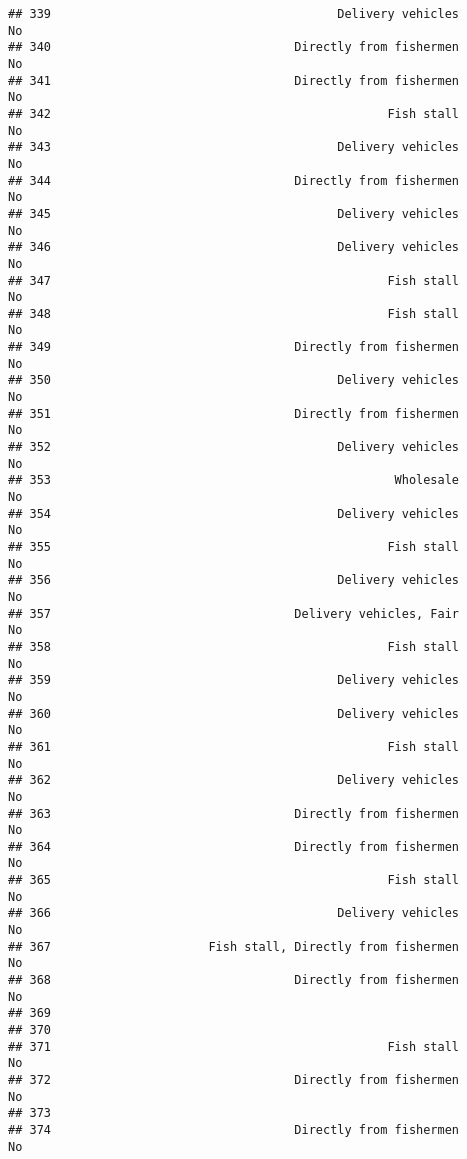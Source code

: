 \documentclass[
]{article}
\begin{document}
\begin{verbatim}
## 339                                        Delivery vehicles        No
## 340                                  Directly from fishermen        No
## 341                                  Directly from fishermen        No
## 342                                               Fish stall        No
## 343                                        Delivery vehicles        No
## 344                                  Directly from fishermen        No
## 345                                        Delivery vehicles        No
## 346                                        Delivery vehicles        No
## 347                                               Fish stall        No
## 348                                               Fish stall        No
## 349                                  Directly from fishermen        No
## 350                                        Delivery vehicles        No
## 351                                  Directly from fishermen        No
## 352                                        Delivery vehicles        No
## 353                                                Wholesale        No
## 354                                        Delivery vehicles        No
## 355                                               Fish stall        No
## 356                                        Delivery vehicles        No
## 357                                  Delivery vehicles, Fair        No
## 358                                               Fish stall        No
## 359                                        Delivery vehicles        No
## 360                                        Delivery vehicles        No
## 361                                               Fish stall        No
## 362                                        Delivery vehicles        No
## 363                                  Directly from fishermen        No
## 364                                  Directly from fishermen        No
## 365                                               Fish stall        No
## 366                                        Delivery vehicles        No
## 367                      Fish stall, Directly from fishermen        No
## 368                                  Directly from fishermen        No
## 369                                                                   
## 370                                                                   
## 371                                               Fish stall        No
## 372                                  Directly from fishermen        No
## 373                                                                   
## 374                                  Directly from fishermen        No

\end{verbatim}
\end{document}
